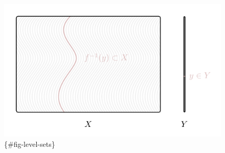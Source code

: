 \documentclass[
  letterpaper,
  DIV=11,
  numbers=noendperiod]{scrartcl}
\begin{document}
\begin{figure}

\begin{minipage}[t]{0.02\linewidth}

{\centering 

~

}

\end{minipage}%
%
\begin{minipage}[t]{0.32\linewidth}

{\centering 

\includegraphics{figures/continuous_marginal/level_sets/level_sets.pdf}
\{\#fig-level-sets\}

}

\end{minipage}%
%
\begin{minipage}[t]{0.32\linewidth}

{\centering 

}
\end{minipage}
\end{figure}
\end{document}
